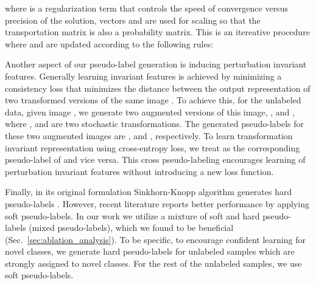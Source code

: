 \documentclass[runningheads]{eccv2022submission}
\begin{document}
\setlength{\abovedisplayskip}{-10pt}
\setlength{\belowdisplayskip}{2pt}
\setlength{\abovedisplayshortskip}{0pt}
\setlength{\belowdisplayshortskip}{0pt}



\noindent where  is a regularization term that controls the speed of convergence versus precision of the solution, vectors  and  are used for scaling  so that the transportation matrix  is also a probability matrix. This is an itereative procedure where  and  are updated according to the following rules: 


\setlength{\abovedisplayskip}{-6pt}
\setlength{\belowdisplayskip}{2pt}
\setlength{\abovedisplayshortskip}{0pt}
\setlength{\belowdisplayshortskip}{0pt}




Another aspect of our pseudo-label generation is inducing perturbation invariant features. Generally learning invariant features is achieved by minimizing a consistency loss that minimizes the distance between the output representation of two transformed versions of the same image \cite{NIPS2016_6333,NIPS2019_8749_MixMatch,Verma2019InterpolationCT}. To achieve this, for the unlabeled data, given image , we generate two augmented versions of this image, , and , where , and  are two stochastic transformations. The generated pseudo-labels for these two augmented images are , and , respectively. To learn transformation invariant representation using cross-entropy loss, we treat  as the corresponding pseudo-label of  and vice versa. This cross pseudo-labeling encourages learning of perturbation invariant features without introducing a new loss function.

Finally, in its original formulation Sinkhorn-Knopp algorithm generates hard pseudo-labels \cite{cuturi2013sinkhorn}. However, recent literature \cite{caron2020unsupervised} reports better performance by applying soft pseudo-labels. In our work we utilize a mixture of soft and hard pseudo-labels (mixed pseudo-labels), which we found to be beneficial (Sec.~\ref{sec:ablation_analysis}). To be specific, to encourage confident learning for novel classes, we generate hard pseudo-labels for unlabeled samples which are strongly assigned to novel classes. For the rest of the unlabeled samples, we use soft pseudo-labels.
\end{document}
